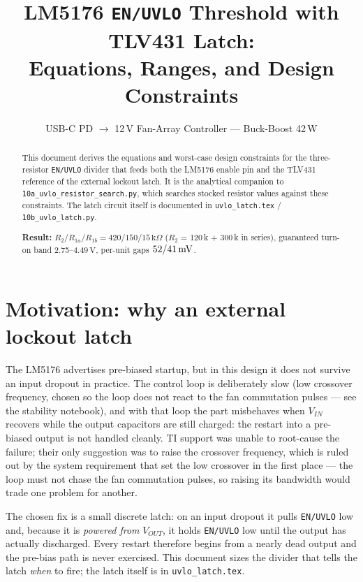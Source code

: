 \documentclass[11pt]{article}
\title{LM5176 \texttt{EN/UVLO} Threshold with TLV431 Latch:\\
Equations, Ranges, and Design Constraints}
\author{USB-C PD $\to$ 12\,V Fan-Array Controller --- Buck-Boost 42\,W}
\date{}
\newcommand{\volt}{\mathrm{V}}\newcommand{\ampere}{\mathrm{A}}
\newcommand{\SI}[2]{\ensuremath{#1\,#2}}
\newcommand{\Rone}{R_{1a}}
\newcommand{\Rtwo}{R_{1b}}
\newcommand{\Rt}{R_{2}}
\begin{document}
\maketitle

\begin{abstract}
\noindent
This document derives the equations and worst-case design constraints for the
three-resistor \texttt{EN/UVLO} divider that feeds both the LM5176 enable pin
and the TLV431 reference of the external lockout latch. It is the analytical
companion to \texttt{10a\_uvlo\_resistor\_search.py}, which searches stocked
resistor values against these constraints. The latch circuit itself is
documented in \texttt{uvlo\_latch.tex} / \texttt{10b\_uvlo\_latch.py}.

\smallskip\noindent
\textbf{Result:} $\Rt/\Rone/\Rtwo = 420/150/15\,\mathrm{k}\Omega$
($\Rt$ = 120\,k $+$ 300\,k in series), guaranteed turn-on band
2.75--\SI{4.49}{\volt}, per-unit gaps $52/\SI{41}{\milli\volt}$.
\end{abstract}

\section{Motivation: why an external lockout latch}

The LM5176 advertises pre-biased startup, but in this design it does not
survive an input dropout in practice. The control loop is deliberately slow
(low crossover frequency, chosen so the loop does not react to the fan
commutation pulses --- see the stability notebook), and with that loop the part
misbehaves when $V_{IN}$ recovers while the output capacitors are still charged:
the restart into a pre-biased output is not handled cleanly. TI support was
unable to root-cause the failure; their only suggestion was to raise the
crossover frequency, which is ruled out by the system requirement that set the
low crossover in the first place --- the loop must not chase the fan
commutation pulses, so raising its bandwidth would trade one problem for
another.

The chosen fix is a small discrete latch: on an input dropout it pulls
\texttt{EN/UVLO} low and, because it is \emph{powered from} $V_{OUT}$, it
holds \texttt{EN/UVLO} low until the output has actually discharged. Every
restart therefore begins from a nearly dead output and the pre-bias path is
never exercised. This document sizes the divider that tells the latch
\emph{when} to fire; the latch itself is in \texttt{uvlo\_latch.tex}.
\end{document}
